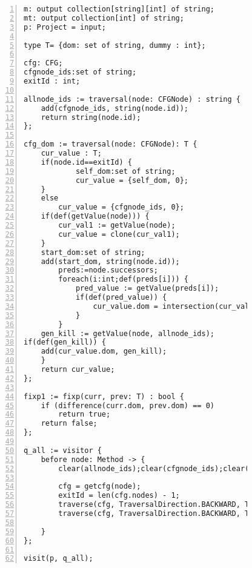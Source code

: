 \begin{figure}[ht!]
\begin{lstlisting}[numbers=left, tabsize=4, escapechar=@, caption={Post Dominator analysis},label={lst:post-dominator-code}] 
m: output collection[string][int] of string;
mt: output collection[int] of string;
p: Project = input;

type T= {dom: set of string, dummy : int};
	
cfg: CFG;
cfgnode_ids:set of string;
exitId : int;

allnode_ids := traversal(node: CFGNode) : string {
	add(cfgnode_ids, string(node.id));
	return string(node.id);
};

cfg_dom := traversal(node: CFGNode): T {
	cur_value : T;
	if(node.id==exitId) {
			self_dom:set of string;
			cur_value = {self_dom, 0};
	}
	else
		cur_value = {cfgnode_ids, 0};
	if(def(getValue(node))) {
		cur_val1 := getValue(node);
		cur_value = clone(cur_val1);
	}
	start_dom:set of string;
	add(start_dom, string(node.id));
		preds:=node.successors;
		foreach(i:int;def(preds[i])) {
			pred_value := getValue(preds[i]);
			if(def(pred_value)) {
				cur_value.dom = intersection(cur_value.dom,pred_value.dom);
			}
		}	
	gen_kill := getValue(node, allnode_ids);
if(def(gen_kill)) {
	add(cur_value.dom, gen_kill);
	}
	return cur_value;
};

fixp1 := fixp(curr, prev: T) : bool {
 	if (difference(curr.dom, prev.dom) == 0)
 		return true;	
 	return false;
};

q_all := visitor {
	before node: Method -> {
		clear(allnode_ids);clear(cfgnode_ids);clear(cfg_dom);

		cfg = getcfg(node);
		exitId = len(cfg.nodes) - 1;
		traverse(cfg, TraversalDirection.BACKWARD, TraversalKind.HYBRID, allnode_ids);
		traverse(cfg, TraversalDirection.BACKWARD, TraversalKind.HYBRID, cfg_dom, fixp1);
		
	}
};

visit(p, q_all);

\end{lstlisting}
\end{figure}